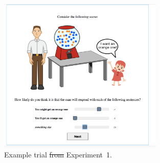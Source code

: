 \documentclass[man, floatsintext]{apa6}
\providecommand{\DIFadd}[1]{{\protect\color{blue}\uwave{#1}}} %
\providecommand{\DIFdel}[1]{{\protect\color{red}\sout{#1}}}                      %
\providecommand{\DIFaddFL}[1]{\DIFadd{#1}} %
\providecommand{\DIFdelFL}[1]{\DIFdel{#1}} %
\providecommand{\DIFaddbeginFL}{} %
\providecommand{\DIFaddendFL}{} %
\providecommand{\DIFdelbeginFL}{} %
\providecommand{\DIFdelendFL}{} %
\newcommand{\DIFscaledelfig}{0.5}
\newlength{\DIFdelgraphicswidth} %
\newlength{\DIFdelgraphicsheight} %
\newcommand{\DIFaddincludegraphics}[2][]{{\color{blue}\fbox{\DIFOincludegraphics[#1]{#2}}}} %
\newcommand{\DIFdelincludegraphics}[2][]{%
\sbox{\DIFdelgraphicsbox}{\DIFOincludegraphics[#1]{#2}}%
\settoboxwidth{\DIFdelgraphicswidth}{\DIFdelgraphicsbox} %
\settoboxtotalheight{\DIFdelgraphicsheight}{\DIFdelgraphicsbox} %
\scalebox{\DIFscaledelfig}{%
\parbox[b]{\DIFdelgraphicswidth}{\usebox{\DIFdelgraphicsbox}\\[-\baselineskip] \rule{\DIFdelgraphicswidth}{0em}}\llap{\resizebox{\DIFdelgraphicswidth}{\DIFdelgraphicsheight}{%
\setlength{\unitlength}{\DIFdelgraphicswidth}%
\begin{picture}(1,1)%
\thicklines\linethickness{2pt} %
{\color[rgb]{1,0,0}\put(0,0){\framebox(1,1){}}}%
{\color[rgb]{1,0,0}\put(0,0){\line( 1,1){1}}}%
{\color[rgb]{1,0,0}\put(0,1){\line(1,-1){1}}}%
\end{picture}%
}\hspace*{3pt}}} %
} %
\DeclareRobustCommand{\DIFaddbeginFL}{\DIFOaddbeginFL \let\includegraphics\DIFaddincludegraphics} %
\DeclareRobustCommand{\DIFaddendFL}{\DIFOaddendFL \let\includegraphics\DIFOincludegraphics} %
\DeclareRobustCommand{\DIFdelbeginFL}{\DIFOdelbeginFL \let\includegraphics\DIFdelincludegraphics} %
\DeclareRobustCommand{\DIFdelendFL}{\DIFOaddendFL \let\includegraphics\DIFOincludegraphics} %
\begin{document}
\begin{figure}[th!]
\center
\includegraphics[width=0.7\textwidth, trim={0 0 1.1cm 0},clip]{plots/pre-test-example-trial.png} 
\caption{Example trial \DIFdelbeginFL \DIFdelFL{from }\DIFdelendFL \DIFaddbeginFL \DIFaddFL{in }\DIFaddendFL Experiment~1. \label{fig:norming-trial} }
\end{figure}
\end{document}
